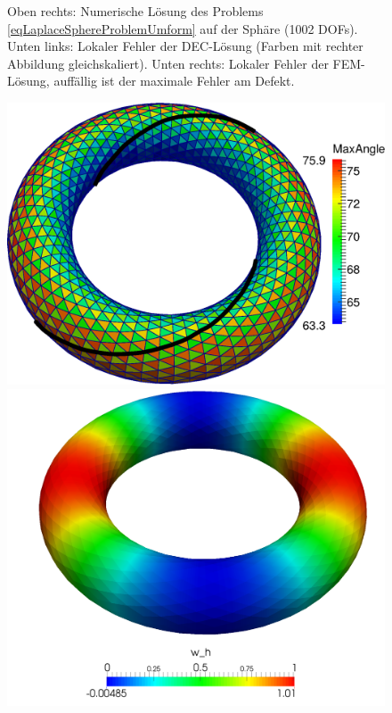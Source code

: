 \begin{figure}
{                                             Oben rechts: Numerische Lösung des Problems \eqref{eqLaplaceSphereProblemUmform} auf der Sphäre
                                             (1002 DOFs). 
                                             Unten links: Lokaler Fehler der DEC-Lösung (Farben mit rechter Abbildung gleichskaliert).
                                             Unten rechts: Lokaler Fehler der FEM-Lösung, auffällig ist der maximale Fehler am Defekt.}
      \label{figLaplaceSphere}
      \begin{minipage}[t]{0.49\textwidth}
        \includegraphics[width=\textwidth]{bilder/laplaceTorus/mesh.eps}
      \end{minipage}
      \hfill
      \begin{minipage}[t]{0.49\textwidth}
        \includegraphics[width=\textwidth]{bilder/laplaceTorus/DECSol1k.png}

\end{minipage}
\end{figure}
